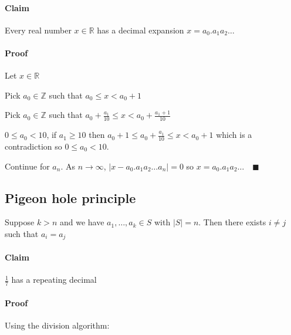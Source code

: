 \documentclass{article}
\newcommand{\bb}[1]{\mathbb{#1}}
\begin{document}
\paragraph{Claim} Every real number \(x\in\bb R\) has a decimal expansion \(x=a_0.a_1a_2\dotso\)

\paragraph{Proof} Let \(x\in\bb R\)

Pick \(a_0\in\bb Z\) such that \(a_0\le x<a_0+1\)

Pick \(a_0\in\bb Z\) such that \(a_0+\frac{a_1}{10}\le x<a_0+\frac{a_1+1}{10}\)

\(0\le a_0<10\), if \(a_1\ge10\) then \(a_0+1\le a_0+\frac{a_1}{10}\le x<a_0+1\) which is a contradiction so \(0\le a_0<10\).

Continue for \(a_n\). As \(n\to\infty\), \(|x-a_0.a_1a_2\dotso a_n|=0\) so \(x=a_0.a_1a_2\dotso\quad\blacksquare\)


\subsection*{Pigeon hole principle}

Suppose \(k>n\) and we have \(a_1,\dotsc,a_k\in S\) with \(|S|=n\). Then there exists \(i\ne j\) such that \(a_i=a_j\) 

\paragraph{Claim} \(\frac 17\) has a repeating decimal

\paragraph{Proof} Using the division algorithm:
\end{document}
